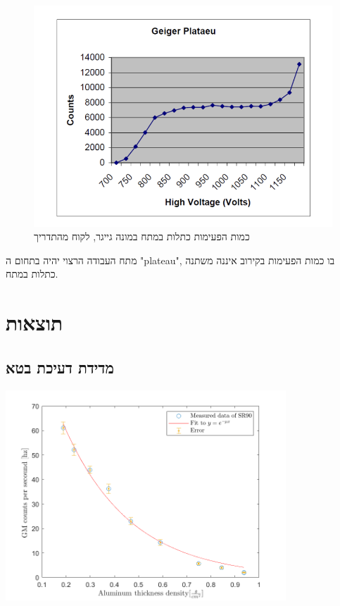 \documentclass{article}
\begin{document}
\begin{figure}[ht!]
    \centering
    \includegraphics{plateau.png}
    \caption{כמות הפעימות כתלות במתח במונה גייגר, לקוח מהתדריך}
    \label{fig:plateau}
\end{figure}

מתח העבודה הרצוי יהיה בתחום ה
\textenglish{"plateau"},
בו כמות הפעימות בקירוב איננה משתנה כתלות במתח.

\section{
תוצאות
}

\subsection{
מדידת דעיכת בטא
}


\begin{graph}[ht!]
    \centering
    \includegraphics[width=0.79\textwidth]{SR90.png}
    \caption{
    }
    \label{graph:decay_SR90}
\end{graph}
\end{document}
